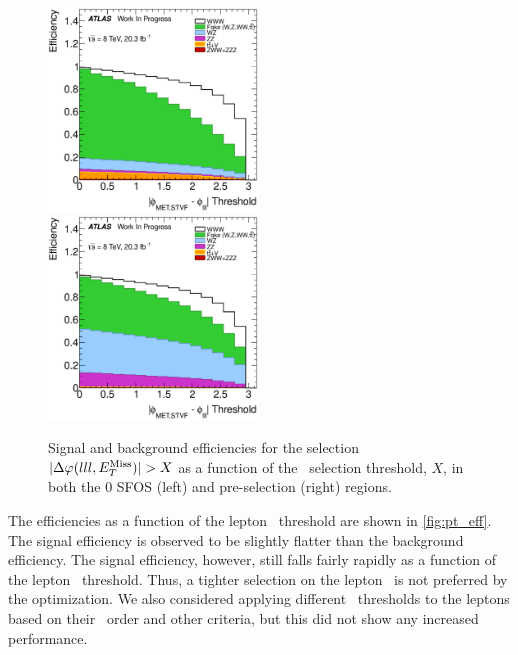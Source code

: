 \begin{figure}[ht!]
\centering
\includegraphics[width=0.495\textwidth]{figures/optimization/SignalRegionsPreselection_0SFOS_Efficiencies/DeltaPhiMETSTVF123_Abs_Cumulative.eps}
\includegraphics[width=0.495\textwidth]{figures/optimization/SignalRegions_0p5mmZ0_Preselection_Efficiencies/DeltaPhiMETSTVF123_Abs_Cumulative.eps}
\caption{ Signal and background efficiencies 
for the selection
$|\Delta\varphi(lll,E_{T}^{\textrm{Miss}})| > X$
as a function of the \deltaphi~selection
threshold, $X$, in both the 0 SFOS (left) and pre-selection (right) regions.  }
\label{fig:deltaphi_eff}
\end{figure}

The efficiencies as a function of the lepton \pt~threshold are shown 
in \fig\ref{fig:pt_eff}. 
The signal efficiency is observed to be slightly flatter
than the background efficiency.
The signal efficiency, however,  still falls fairly 
rapidly as a function of the lepton \pt~threshold. 
Thus, a tighter selection on the lepton \pt~is not preferred
by the optimization. We also considered 
applying different \pt~thresholds to the leptons
based on their \pt~order and other criteria, but
this did not show any increased performance.


